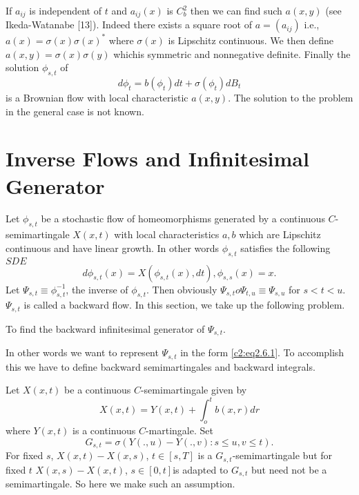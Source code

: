 If $a_{ij}$ is independent of $t$ and $a_{ij}(x)$ is $C^2_b$ then we
can find such $a(x,y)$ (see Ikeda-Watanabe [13]). Indeed there exists a
square root of $a =(a_{ij})$ i.e., $a(x)=\sigma(x)\sigma(x)^*$ where
$\sigma(x)$ is Lipschitz continuous. We then define $a(x,y) = \sigma(x)
\sigma(y)$ which\pageoriginale is symmetric and nonnegative definite. Finally the
solution $\phi_{s,t}$ of 
$$
d \phi_t = b(\phi_t)dt+\sigma(\phi_t)dB_t
$$
is a Brownian flow with local characteristic $a(x,y)$. The solution to
the problem in the general case is not known. 

\section{Inverse Flows and Infinitesimal Generator}\label{chap2:sec2.6}%

Let $\phi_{s,t}$ be a stochastic flow of homeomorphisms generated by a
continuous $C$-semimartingale $X(x,t)$ with local characteristics $a,b$
which are Lipschitz continuous and have linear growth. In other words
$\phi_{s,t}$ satisfies the following $SDE$ 
\begin{equation*}
  d\phi_{s,t}(x)=X(\phi_{s,t}(x),dt),
\phi_{s,s}(x)=x. \tag{2.6.1}\label{c2:eq2.6.1}
\end{equation*}
Let $\Psi _{s,t} \equiv \phi^{-1}_{s,t}$, the inverse of
$\phi_{s,t}$. Then obviously $\Psi_{s,t} o \Psi_{t,u} \equiv \Psi_{s,u}$
for $s < t < u$. $\Psi_{s,t}$ is called a backward flow. In this
section, we take up the following problem.  



\medskip
{}
  To find the backward infinitesimal generator of  $\Psi_{s,t}$.
 
 In other words we want to represent $\Psi_{s,t}$ in the form
 \eqref{c2:eq2.6.1}. To accomplish this we have to define backward
 semimartingales and backward integrals. 
 
 Let $X(x,t)$ be a continuous $C$-semimartingale given by 
 \begin{equation*}
X(x,t)=Y(x,t)+\int^t_o b(x,r)dr \tag{2.6.2}\label{c2:eq2.6.2}
 \end{equation*} 
where $Y(x,t)$ is a continuous $C$-martingale. Set
$$
G_{s,t}=\sigma(Y(., u)-Y(.,v):s \leq u, v \leq t).
$$
For fixed $s$, $X(x,t)-X(x,s)$, $t \in [s,T]$ is a
$G_{s,t}$-semimartingale but for fixed $t$ $X(x,s)-X(x,t)$, $s \in
[0,t]$\pageoriginale is adapted to $G_{s,t}$ but need not be a semimartingale. So
here we make such an assumption. 

